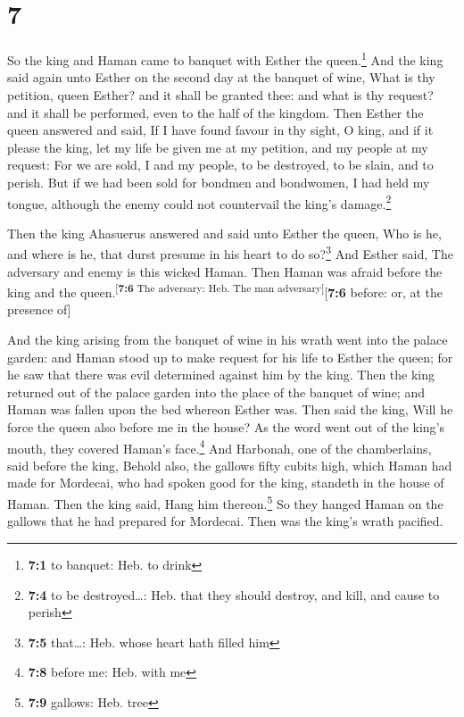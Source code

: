 \hypertarget{section-6}{%
\section{7}\label{section-6}}

 So the king and Haman came to banquet with Esther the
queen.\footnote{\textbf{7:1} to banquet: Heb. to drink} 
And the king said again unto Esther on the second day at the banquet of
wine, What is thy petition, queen Esther? and it shall be granted thee:
and what is thy request? and it shall be performed, even to the half of
the kingdom.  Then Esther the queen answered and said, If
I have found favour in thy sight, O king, and if it please the king, let
my life be given me at my petition, and my people at my request:
 For we are sold, I and my people, to be destroyed, to be
slain, and to perish. But if we had been sold for bondmen and bondwomen,
I had held my tongue, although the enemy could not countervail the
king's damage.\footnote{\textbf{7:4} to be destroyed\ldots: Heb. that
  they should destroy, and kill, and cause to perish}

 Then the king Ahasuerus answered and said unto Esther the
queen, Who is he, and where is he, that durst presume in his heart to do
so?\footnote{\textbf{7:5} that\ldots: Heb. whose heart hath filled him}
 And Esther said, The adversary and enemy is this wicked
Haman. Then Haman was afraid before the king and the
queen.\textsuperscript{{[}\textbf{7:6} The adversary: Heb. The man
adversary{]}}{[}\textbf{7:6} before: or, at the presence of{]}

 And the king arising from the banquet of wine in his
wrath went into the palace garden: and Haman stood up to make request
for his life to Esther the queen; for he saw that there was evil
determined against him by the king.  Then the king
returned out of the palace garden into the place of the banquet of wine;
and Haman was fallen upon the bed whereon Esther was. Then said the
king, Will he force the queen also before me in the house? As the word
went out of the king's mouth, they covered Haman's face.\footnote{\textbf{7:8}
  before me: Heb. with me}  And Harbonah, one of the
chamberlains, said before the king, Behold also, the gallows fifty
cubits high, which Haman had made for Mordecai, who had spoken good for
the king, standeth in the house of Haman. Then the king said, Hang him
thereon.\footnote{\textbf{7:9} gallows: Heb. tree}  So
they hanged Haman on the gallows that he had prepared for Mordecai. Then
was the king's wrath pacified.

